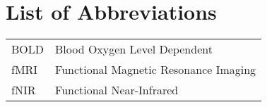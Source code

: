 \chapter*{List of Abbreviations}
\begin{table*}[h]
  \small
    \begin{tabular*}{\linewidth}{l l}
      BOLD & Blood Oxygen Level Dependent \\
      fMRI & Functional Magnetic Resonance Imaging \\
      fNIR & Functional Near-Infrared \\
    \end{tabular*}
\end{table*}